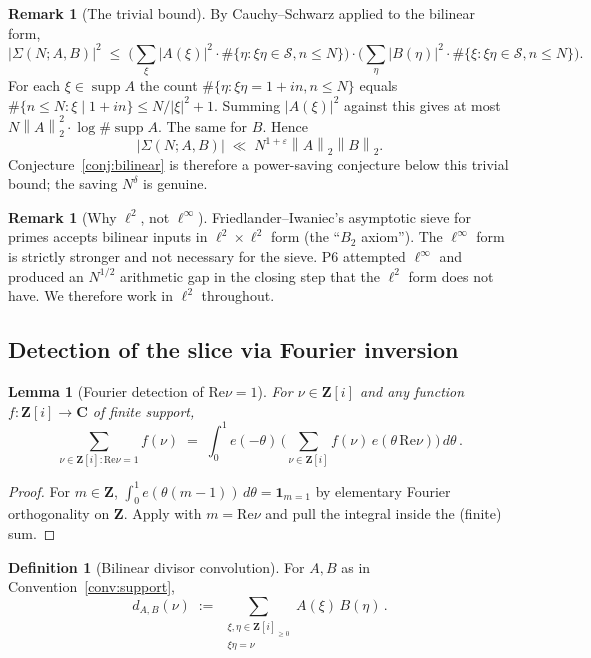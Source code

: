 \documentclass[11pt]{article}
\newtheorem{lemma}[theorem]{Lemma}
\theoremstyle{definition}
\newtheorem{definition}[theorem]{Definition}
\newtheorem{remark}[theorem]{Remark}
\newcommand{\Z}{\mathbf{Z}}
\newcommand{\C}{\mathbf{C}}
\newcommand{\Zi}{\Z[i]}
\renewcommand{\Re}{\mathrm{Re}}
\newcommand{\norm}[1]{\left\lVert #1\right\rVert}
\DeclareMathOperator{\supp}{supp}
\begin{document}
\begin{remark}[The trivial bound]\label{rem:trivial-bound}
By Cauchy--Schwarz applied to the bilinear form,
\[
   |\Sigma(N;A,B)|^2\;\le\;\Big(\sum_\xi|A(\xi)|^2 \cdot\#\{\eta:\xi\eta\in\mathcal S,n\le N\}\Big)\cdot\Big(\sum_\eta|B(\eta)|^2 \cdot\#\{\xi:\xi\eta\in\mathcal S,n\le N\}\Big).
\]
For each $\xi\in\supp A$ the count $\#\{\eta:\xi\eta=1+in,n\le N\}$ equals $\#\{n\le N:\xi\mid 1+in\}\le N/|\xi|^2+1$. Summing $|A(\xi)|^2$ against this gives at most $N\norm{A}_2^2\cdot\log\#\supp A$. The same for $B$. Hence
\[
   |\Sigma(N;A,B)|\;\ll\;N^{1+\varepsilon}\norm{A}_2\norm{B}_2.
\]
Conjecture~\ref{conj:bilinear} is therefore a power-saving conjecture below this trivial bound; the saving $N^\delta$ is genuine.
\end{remark}

\begin{remark}[Why $\ell^2$, not $\ell^\infty$]\label{rem:why-ell2}
Friedlander--Iwaniec's asymptotic sieve for primes \cite{FI98a} accepts bilinear inputs in $\ell^2\times\ell^2$ form (the ``$B_2$ axiom''). The $\ell^\infty$ form is strictly stronger and not necessary for the sieve. P6 attempted $\ell^\infty$ and produced an $N^{1/2}$ arithmetic gap in the closing step that the $\ell^2$ form does not have. We therefore work in $\ell^2$ throughout.
\end{remark}

\subsection{Detection of the slice via Fourier inversion}\label{ssec:slice-fourier}

\begin{lemma}[Fourier detection of $\Re\nu=1$]\label{lem:slice-detection}
For $\nu\in\Zi$ and any function $f:\Zi\to\C$ of finite support,
\[
   \sum_{\nu\in\Zi:\Re\nu=1}f(\nu)\;=\;\int_0^1 e(-\theta)\,\Big(\sum_{\nu\in\Zi}f(\nu)\,e(\theta\,\Re\nu)\Big)\,d\theta\,.
\]
\end{lemma}

\begin{proof}
For $m\in\Z$, $\int_0^1 e(\theta(m-1))\,d\theta=\mathbf 1_{m=1}$ by elementary Fourier orthogonality on $\Z$. Apply with $m=\Re\nu$ and pull the integral inside the (finite) sum.
\end{proof}

\begin{definition}[Bilinear divisor convolution]\label{def:dAB}
For $A,B$ as in Convention~\ref{conv:support},
\[
   d_{A,B}(\nu)\;:=\;\sum_{\substack{\xi,\eta\in\Zi_{\ge 0}\\\xi\eta=\nu}}A(\xi)\,B(\eta)\,.
\]
\end{definition}
\end{document}
